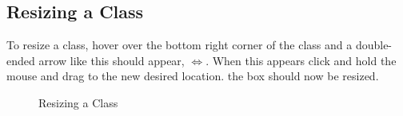 \documentclass[a4paper]{article}
\begin{document}
{\subsection{Resizing a Class}
To resize a class, hover over the bottom right corner of the class and a double-ended arrow like this should appear, $\Leftrightarrow$. When this appears click and hold the mouse and drag to the new desired location. the box should now be resized.
\begin{figure}[H]
\begin{center}
 \imagespace
{}
\caption{Resizing a Class}
\end{center}
\end{figure}
}
\end{document}
